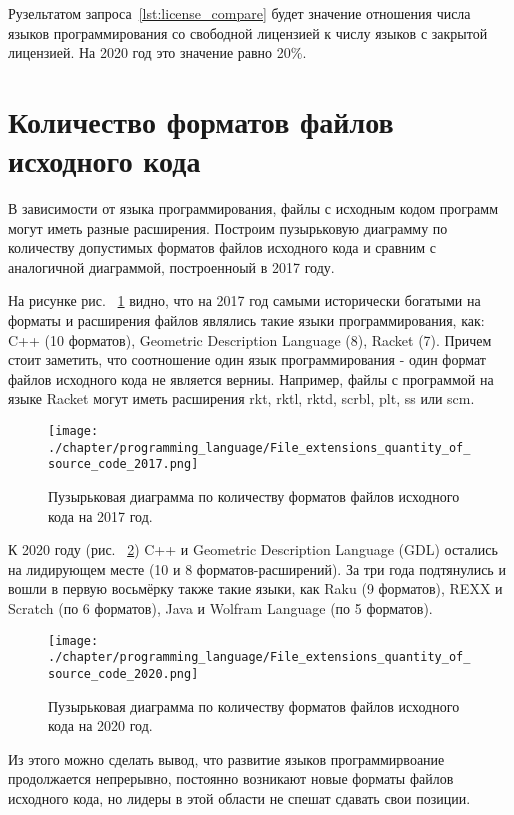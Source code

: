Рузельтатом запроса~\ref{lst:license_compare} будет значение отношения числа языков программирования со свободной лицензией к числу языков с закрытой лицензией. На 2020 год это значение равно 20\%.

\section{Количество форматов файлов исходного кода}
В зависимости от языка программирования, файлы с исходным кодом программ могут иметь разные расширения. Построим пузырьковую диаграмму по количеству допустимых форматов файлов исходного кода и сравним с аналогичной диаграммой, построенноый в 2017 году.

На рисунке рис. ~\ref{fig:source_files_format_2017} видно, что на 2017 год самыми исторически богатыми на форматы и расширения файлов являлись такие языки программирования, как: C++ (10 форматов), Geometric Description Language (8), Racket (7). Причем стоит заметить, что соотношение один язык программирования - один формат файлов исходного кода не является верниы. Например, файлы с программой на языке Racket могут иметь расширения rkt, rktl, rktd, scrbl, plt, ss или scm.

\begin{figure}[h]
\centering
	\texttt{[image: ./chapter/programming\_language/File\_extensions\_quantity\_of\_source\_code\_2017.png]}
	\caption{Пузырьковая диаграмма по количеству форматов файлов исходного кода на 2017 год.}
	\label{fig:source_files_format_2017}
\end{figure}

К 2020 году (рис. ~\ref{fig:source_files_format_2020}) C++ и Geometric Description Language (GDL) остались на лидирующем месте (10 и 8 форматов-расширений). За три года подтянулись и вошли в первую восьмёрку также такие языки, как Raku (9 форматов), REXX и Scratch (по 6 форматов), Java и Wolfram Language (по 5 форматов).

\begin{figure}[h]
\centering
	\texttt{[image: ./chapter/programming\_language/File\_extensions\_quantity\_of\_source\_code\_2020.png]}
	\caption{Пузырьковая диаграмма по количеству форматов файлов исходного кода на 2020 год.}
	\label{fig:source_files_format_2020}
\end{figure}

Из этого можно сделать вывод, что развитие языков программирвоание продолжается непрерывно, постоянно возникают новые форматы файлов исходного кода, но лидеры в этой области не спешат сдавать свои позиции.

